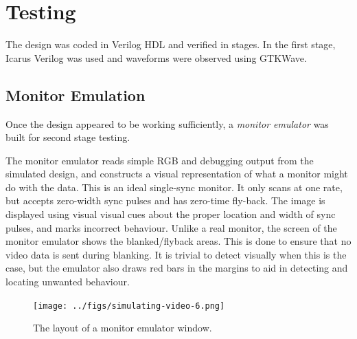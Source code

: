 


\section{Testing}

The design was coded in Verilog HDL and verified in stages. In the first stage,
Icarus Verilog was used and waveforms were observed using GTKWave. 


\subsection{Monitor Emulation}

Once the design appeared to be working sufficiently, a {\em monitor emulator\/}
was built for second stage testing.

The monitor emulator reads simple RGB and debugging output from the simulated
design, and constructs a visual representation of what a monitor might do with
the data. This is an ideal single-sync monitor. It only scans at one rate, but
accepts zero-width sync pulses and has zero-time fly-back. The image is
displayed using visual visual cues about the proper location and width of sync
pulses, and marks incorrect behaviour. Unlike a real monitor, the screen of the
monitor emulator shows the blanked/flyback areas. This is done to ensure that
no video data is sent during blanking. It is trivial to detect visually when
this is the case, but the emulator also draws red bars in the margins to aid in
detecting and locating unwanted behaviour.

\begin{figure}[htb]
  \centering
  \texttt{[image: ../figs/simulating-video-6.png]}
  \caption[Monitor Emulator Window Layout]{\label{fig:vdu:monitor-emu}The
    layout of a monitor emulator window. }
\end{figure}

